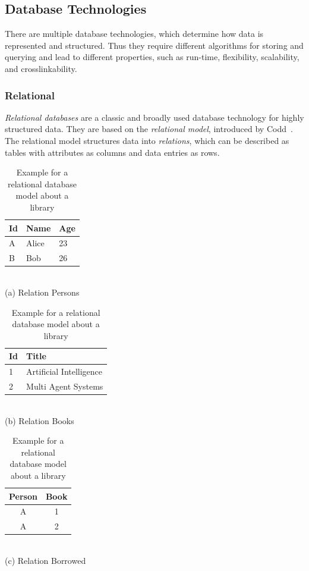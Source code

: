 \subsection{Database Technologies}
\label{sec:db-designs}
There are multiple database technologies, which determine how data is
represented and structured. Thus they require different algorithms for
storing and querying and lead to different properties, such as
run-time, flexibility, scalability, and crosslinkability.

\subsubsection{Relational}
\label{sec:relational}
\emph{Relational databases} are a classic and broadly used database
technology for highly structured data. They are based on the
\emph{relational model}, introduced by
Codd~\cite{database-designs,relational}. The relational model
structures data into \emph{relations}, which can be described as
tables with attributes as columns and data entries as rows.
\begin{table}[ht]
  \begin{minipage}[b]{0.3\linewidth}\centering
  \begin{tabular}{ l|l|l }
    Id & Name & Age\\
    \hline
    A & Alice & 23\\
    B & Bob & 26\\
  \end{tabular}
  \\\vspace{0.2cm}
  (a) Relation Persons
\end{minipage}
\hspace{0.5cm}
\begin{minipage}[b]{0.3\linewidth}
\centering
  \begin{tabular}{ l|l }
    Id & Title\\
    \hline
    1 & Artificial Intelligence\\
    2 & Multi Agent Systems \\
  \end{tabular}
  \\\vspace{0.2cm}
  (b) Relation Books
\end{minipage}
\hspace{0.5cm}
\begin{minipage}[b]{0.3\linewidth}
\centering
  \begin{tabular}{ c|c }
    Person & Book\\
    \hline
    A & 1\\
    A & 2\\
  \end{tabular}
  \\\vspace{0.2cm}
  (c) Relation Borrowed
\end{minipage}
  \caption{Example for a relational database model about a
    library}
  \label{tab:relational-example}
\end{table}

